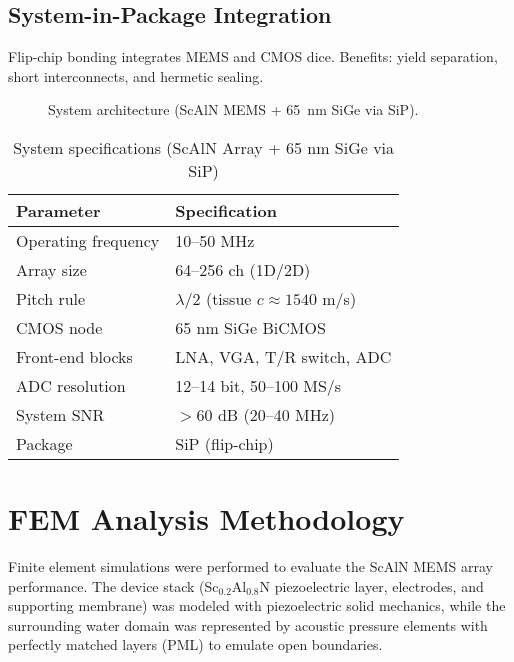 \documentclass[conference]{IEEEtran}
\begin{document}
\subsection{System-in-Package Integration}
Flip-chip bonding integrates MEMS and CMOS dice. Benefits: yield separation, short interconnects, and hermetic sealing.

\begin{figure}[!t]
\centering
{}
\caption{System architecture (ScAlN MEMS + 65~nm SiGe via SiP).}
\label{fig:arch}
\end{figure}

\begin{table}[!t]
\caption{System specifications (ScAlN Array + 65 nm SiGe via SiP)}
\label{tab:spec}
\centering
\begin{tabular}{@{}ll@{}}
\toprule
\textbf{Parameter} & \textbf{Specification}\\
\midrule
Operating frequency & 10--50 MHz\\
Array size & 64--256 ch (1D/2D)\\
Pitch rule & $\lambda/2$ (tissue $c\!\approx\!1540$ m/s)\\
CMOS node & 65 nm SiGe BiCMOS\\
Front-end blocks & LNA, VGA, T/R switch, ADC\\
ADC resolution & 12--14 bit, 50--100 MS/s\\
System SNR & $>60$ dB (20--40 MHz)\\
Package & SiP (flip-chip)\\
\bottomrule
\end{tabular}
\end{table}

\section{FEM Analysis Methodology}
Finite element simulations were performed to evaluate the ScAlN MEMS array performance. The device stack (Sc$_{0.2}$Al$_{0.8}$N piezoelectric layer, electrodes, and supporting membrane) was modeled with piezoelectric solid mechanics, while the surrounding water domain was represented by acoustic pressure elements with perfectly matched layers (PML) to emulate open boundaries.
\end{document}
